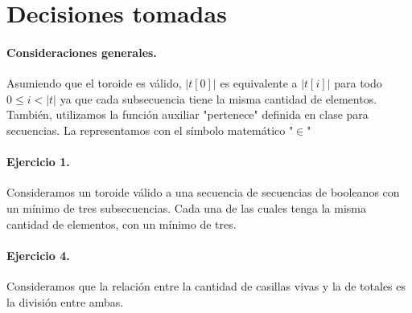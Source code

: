 \documentclass[a4paper]{article}
\begin{document}
\section{Decisiones tomadas}
\paragraph{Consideraciones generales.}
Asumiendo que el toroide es válido, $|t[0]|$ es equivalente  a $ |t[i]| $ para todo $ 0 \leq i < |t|$ ya que cada subsecuencia tiene la misma cantidad de elementos.\newline
	\enspace También, utilizamos la función auxiliar "pertenece" definida en clase para secuencias. La representamos con el símbolo matemático "$\in$"

\paragraph{Ejercicio 1.}
Consideramos un toroide válido a una secuencia de secuencias de booleanos con un mínimo de tres subsecuencias. Cada una de las cuales tenga la misma cantidad de elementos, con un mínimo de tres. 

\paragraph{Ejercicio 4.}
Consideramos que la relación entre la cantidad de casillas vivas y la de totales es la división entre ambas.
\end{document}
